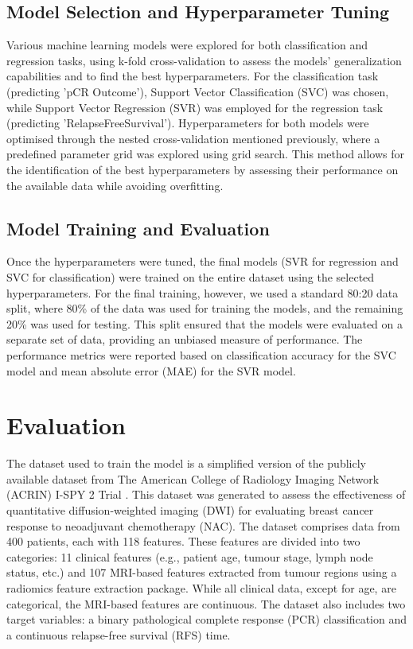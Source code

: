 \documentclass{article}
\begin{document}
\subsection{Model Selection and Hyperparameter Tuning}

Various machine learning models were explored for both classification and regression tasks, using k-fold cross-validation to assess the models' generalization capabilities and to find the best hyperparameters. For the classification task (predicting 'pCR Outcome'), Support Vector Classification (SVC) was chosen, while Support Vector Regression (SVR) was employed for the regression task (predicting 'RelapseFreeSurvival'). Hyperparameters for both models were optimised through the nested cross-validation mentioned previously, where a predefined parameter grid was explored using grid search. This method allows for the identification of the best hyperparameters by assessing their performance on the available data while avoiding overfitting.

\subsection{Model Training and Evaluation}

Once the hyperparameters were tuned, the final models (SVR for regression and SVC for classification) were trained on the entire dataset using the selected hyperparameters. For the final training, however, we used a standard 80:20 data split, where 80\% of the data was used for training the models, and the remaining 20\% was used for testing. This split ensured that the models were evaluated on a separate set of data, providing an unbiased measure of performance. The performance metrics were reported based on classification accuracy for the SVC model and mean absolute error (MAE) for the SVR model.

\section{Evaluation}

The dataset used to train the model is a simplified version of the publicly available dataset from The American College of Radiology Imaging Network (ACRIN) I-SPY 2 Trial \cite{newitt2021acr}. This dataset was generated to assess the effectiveness of quantitative diffusion-weighted imaging (DWI) for evaluating breast cancer response to neoadjuvant chemotherapy (NAC). The dataset comprises data from 400 patients, each with 118 features. These features are divided into two categories: 11 clinical features (e.g., patient age, tumour stage, lymph node status, etc.) and 107 MRI-based features extracted from tumour regions using a radiomics feature extraction package. While all clinical data, except for age, are categorical, the MRI-based features are continuous. The dataset also includes two target variables: a binary pathological complete response (PCR) classification and a continuous relapse-free survival (RFS) time.
\end{document}
